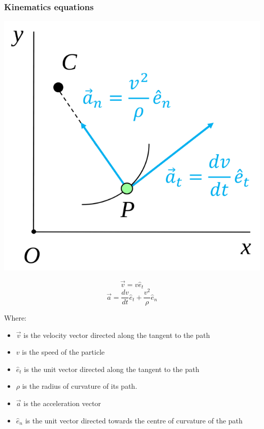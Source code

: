 \documentclass[11pt]{article}
\begin{document}
\subsubsection{Kinematics equations}
\label{sec:org76a98de}
\begin{center}
\includegraphics[width=.9\linewidth]{./images/path-coordinates-kinematics-equations.png}
\end{center}
\[\vec{v} = v \hat{e}_t\]
\[\vec{a} = \frac{dv}{dt} \hat{e}_t + \frac{v^2}{\rho} \hat{e}_n\]

Where:
\begin{itemize}
\item \(\vec{v}\) is the velocity vector directed along the tangent to the path
\item \(v\) is the speed of the particle
\item \(\hat{e}_t\) is the unit vector directed along the tangent to the path
\item \(\rho\) is the radius of curvature of its path.
\item \(\vec{a}\) is the acceleration vector
\item \(\hat{e}_n\) is the unit vector directed towards the centre of curvature of the path
\end{itemize}
\end{document}
